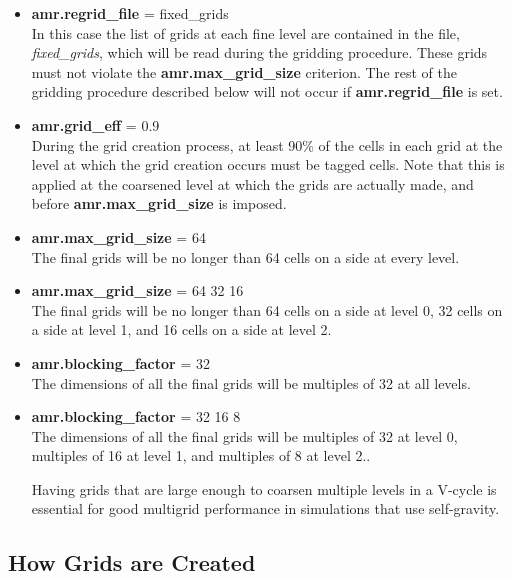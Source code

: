 \begin{itemize} 

\item {\bf amr.regrid\_file} = fixed\_grids \\ 
In this case the list of grids at each fine level are contained in the file, {\em fixed\_grids},
which will be read during the gridding procedure.  These grids must not violate the
{\bf amr.max\_grid\_size} criterion.   The rest of the gridding procedure described below
will not occur if {\bf amr.regrid\_file} is set.

\item {\bf amr.grid\_eff} = 0.9\\ 
During the grid creation process, at least 90\% of the cells in each grid at the
level at which the grid creation occurs must be tagged cells.   Note that this is applied
at the coarsened level at which the grids are actually made, and before {\bf amr.max\_grid\_size}
is imposed.

\item {\bf amr.max\_grid\_size} = 64 \\ 
The final grids will be no longer than 64 cells on a side at every level.

\item {\bf amr.max\_grid\_size} = 64 32 16 \\ 
The final grids will be no longer than 64 cells on a side
at level 0, 32 cells on a side at level 1, and 16 cells on a side at level 2.

\item {\bf amr.blocking\_factor} = 32 \\
The dimensions of all the final grids will be multiples of 32 at all levels.

\item {\bf amr.blocking\_factor} = 32 16 8\\
The dimensions of all the final grids will be multiples of 32
at level 0, multiples of 16 at level 1, and multiples of 8 at level 2..  

Having grids that are large enough to coarsen multiple levels in a V-cycle is essential
for good multigrid performance in simulations that use self-gravity.

\end{itemize}

\subsection{How Grids are Created}

